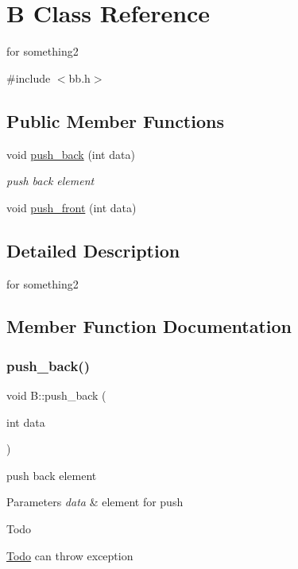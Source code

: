 \hypertarget{classB}{}\section{B Class Reference}
\label{classB}


for something2  




{\ttfamily \#include $<$bb.\+h$>$}

\subsection*{Public Member Functions}
\begin{DoxyCompactItemize}
\item 
void \hyperlink{classB_acba8ee661dc45269ef1224dbbfd548e6}{push\+\_\+back} (int data)
\begin{DoxyCompactList}\small\item\em push back element \end{DoxyCompactList}\item 
void \hyperlink{classB_a1b029a313c054151d142c3914f262974}{push\+\_\+front} (int data)
\end{DoxyCompactItemize}


\subsection{Detailed Description}
for something2 



\subsection{Member Function Documentation}
\mbox{\label{classB_acba8ee661dc45269ef1224dbbfd548e6}} 
\subsubsection{\texorpdfstring{push\+\_\+back()}{push\_back()}}
{\footnotesize\ttfamily void B\+::push\+\_\+back (\begin{DoxyParamCaption}\item[{int}]{data }\end{DoxyParamCaption})}



push back element 


\begin{DoxyParams}{Parameters}
{\em data} & element for push\\
\hline
\end{DoxyParams}
\begin{DoxyRefDesc}{Todo}
\item[\hyperlink{todo__todo000002}{Todo}]can throw exception \end{DoxyRefDesc}
\mbox{\label{classB_a1b029a313c054151d142c3914f262974}} 
